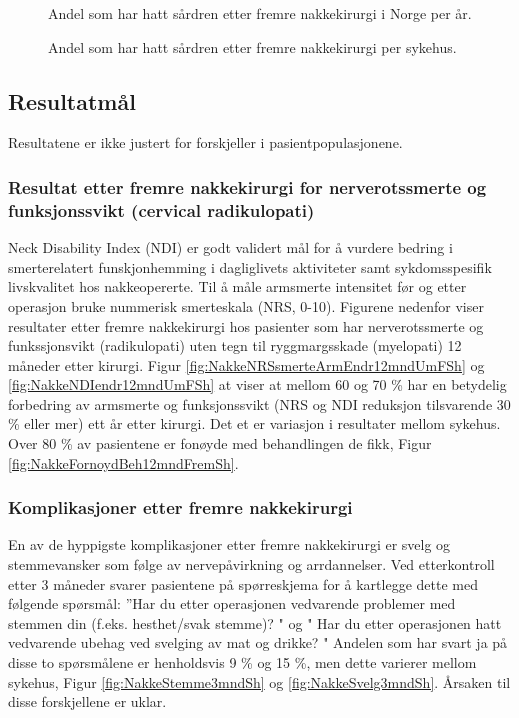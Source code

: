 \documentclass [norsk,a4paper,twoside]{article}\usepackage[]{graphicx}\usepackage[]{color}
\begin{document}
\begin{figure}[ht]
\caption{\label{fig:NakkeSaardrenUmFTid} Andel som har hatt sårdren etter fremre nakkekirurgi i Norge per år.}
\end{figure}

\begin{figure}[ht]
\caption{\label{fig:NakkeSaardrenUmFSh} Andel som har hatt sårdren etter fremre nakkekirurgi per sykehus.}
\end{figure}

\subsection{Resultatmål}


Resultatene er ikke justert for forskjeller i pasientpopulasjonene.
\subsubsection{Resultat etter fremre nakkekirurgi for nerverotssmerte og funksjonssvikt (cervical radikulopati)}
Neck Disability Index (NDI) er godt validert mål for å vurdere bedring i smerterelatert funskjonhemming  i dagliglivets aktiviteter samt sykdomsspesifik livskvalitet hos nakkeopererte. Til å måle armsmerte intensitet før og etter operasjon bruke nummerisk smerteskala (NRS, 0-10). Figurene nedenfor viser resultater etter fremre nakkekirurgi hos pasienter som har nerverotssmerte og funkssjonsvikt (radikulopati) uten tegn til ryggmargsskade (myelopati) 12 måneder etter kirurgi. Figur \ref{fig:NakkeNRSsmerteArmEndr12mndUmFSh} og  \ref{fig:NakkeNDIendr12mndUmFSh} at viser at mellom 60 og 70 \% har en betydelig forbedring av armsmerte og funksjonssvikt (NRS og NDI reduksjon tilsvarende 30 \%  eller mer) ett år etter kirurgi. Det et er variasjon i resultater mellom sykehus. Over 80 \% av pasientene er fonøyde med behandlingen de fikk, Figur \ref{fig:NakkeFornoydBeh12mndFremSh}.    
\subsubsection{Komplikasjoner etter fremre nakkekirurgi}
En av de hyppigste komplikasjoner etter fremre nakkekirurgi er svelg og stemmevansker som følge av nervepåvirkning og arrdannelser. Ved etterkontroll etter 3 måneder svarer pasientene på spørreskjema for å kartlegge dette med følgende spørsmål: ''Har du etter operasjonen vedvarende problemer med stemmen din (f.eks. hesthet/svak stemme)? " og " Har du etter operasjonen hatt vedvarende ubehag ved svelging av mat og drikke? "
Andelen som har svart ja på disse to spørsmålene er henholdsvis 9 \% og 15 \%, men dette  varierer mellom sykehus, Figur \ref{fig:NakkeStemme3mndSh} og \ref{fig:NakkeSvelg3mndSh}. Årsaken til disse forskjellene er uklar. 
\end{document}
